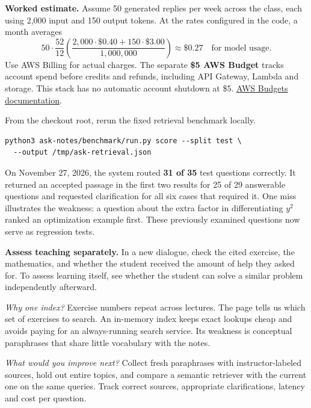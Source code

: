 \documentclass[12pt,letterpaper]{article}
\newcommand{\hd}[1]{\par\addvspace{9pt}{\large\bfseries #1\par}\nobreak}
\newcommand{\lnk}[2]{\href{#1}{\underline{#2}}}
\begin{document}
\textbf{Worked estimate.} Assume 50 generated replies per week across the class, each using 2,000 input and 150 output tokens. At the rates configured in the code, a month averages
\[
  50\cdot\frac{52}{12}
  \left(\frac{2{,}000\cdot\$0.40+150\cdot\$3.00}{1{,}000{,}000}\right)
  \approx \$0.27 \quad\text{for model usage.}
\]
Use AWS Billing for actual charges. The separate \textbf{\$5 AWS Budget} tracks account spend before credits and refunds, including API Gateway, Lambda and storage. This stack has no automatic account shutdown at \$5. \lnk{https://docs.aws.amazon.com/cost-management/latest/userguide/budgets-managing-costs.html}{AWS Budgets documentation}.
\hd{What has been tested?}
From the checkout root, rerun the fixed retrieval benchmark locally.
{\small\begin{verbatim}
python3 ask-notes/benchmark/run.py score --split test \
  --output /tmp/ask-retrieval.json
\end{verbatim}}
On November 27, 2026, the system routed \textbf{31 of 35} test questions correctly. It returned an accepted passage in the first two results for 25 of 29 answerable questions and requested clarification for all six cases that required it. One miss illustrates the weakness: a question about the extra factor in differentiating \(y^2\) ranked an optimization example first. These previously examined questions now serve as regression tests.

\textbf{Assess teaching separately.} In a new dialogue, check the cited exercise, the mathematics, and whether the student received the amount of help they asked for. To assess learning itself, see whether the student can solve a similar problem independently afterward.
\hd{Explain it in an interview}
\emph{Why one index?} Exercise numbers repeat across lectures. The page tells us which set of exercises to search. An in-memory index keeps exact lookups cheap and avoids paying for an always-running search service. Its weakness is conceptual paraphrases that share little vocabulary with the notes.

\emph{What would you improve next?} Collect fresh paraphrases with instructor-labeled sources, hold out entire topics, and compare a semantic retriever with the current one on the same queries. Track correct sources, appropriate clarifications, latency and cost per question.
\end{document}
